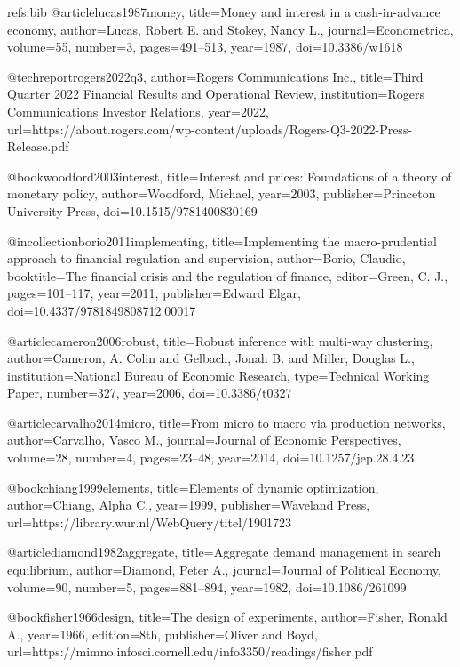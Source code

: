 \begin{filecontents}[overwrite]{refs.bib}
@article{lucas1987money,
  title={Money and interest in a cash-in-advance economy},
  author={Lucas, Robert E. and Stokey, Nancy L.},
  journal={Econometrica},
  volume={55},
  number={3},
  pages={491--513},
  year={1987},
  doi={10.3386/w1618}
}

@techreport{rogers2022q3,
  author={{Rogers Communications Inc.}},
  title={Third Quarter 2022 Financial Results and Operational Review},
  institution={Rogers Communications Investor Relations},
  year={2022},
  url={https://about.rogers.com/wp-content/uploads/Rogers-Q3-2022-Press-Release.pdf}
}

@book{woodford2003interest,
  title={Interest and prices: Foundations of a theory of monetary policy},
  author={Woodford, Michael},
  year={2003},
  publisher={Princeton University Press},
  doi={10.1515/9781400830169}
}

@incollection{borio2011implementing,
  title={Implementing the macro-prudential approach to financial regulation and supervision},
  author={Borio, Claudio},
  booktitle={The financial crisis and the regulation of finance},
  editor={Green, C. J.},
  pages={101--117},
  year={2011},
  publisher={Edward Elgar},
  doi={10.4337/9781849808712.00017}
}

@article{cameron2006robust,
  title={Robust inference with multi-way clustering},
  author={Cameron, A. Colin and Gelbach, Jonah B. and Miller, Douglas L.},
  institution={National Bureau of Economic Research},
  type={Technical Working Paper},
  number={327},
  year={2006},
  doi={10.3386/t0327}
}

@article{carvalho2014micro,
  title={From micro to macro via production networks},
  author={Carvalho, Vasco M.},
  journal={Journal of Economic Perspectives},
  volume={28},
  number={4},
  pages={23--48},
  year={2014},
  doi={10.1257/jep.28.4.23}
}

@book{chiang1999elements,
  title={Elements of dynamic optimization},
  author={Chiang, Alpha C.},
  year={1999},
  publisher={Waveland Press},
  url={https://library.wur.nl/WebQuery/titel/1901723}
}

@article{diamond1982aggregate,
  title={Aggregate demand management in search equilibrium},
  author={Diamond, Peter A.},
  journal={Journal of Political Economy},
  volume={90},
  number={5},
  pages={881--894},
  year={1982},
  doi={10.1086/261099}
}

@book{fisher1966design,
  title={The design of experiments},
  author={Fisher, Ronald A.},
  year={1966},
  edition={8th},
  publisher={Oliver and Boyd},
  url={https://mimno.infosci.cornell.edu/info3350/readings/fisher.pdf}
}


\end{filecontents}
